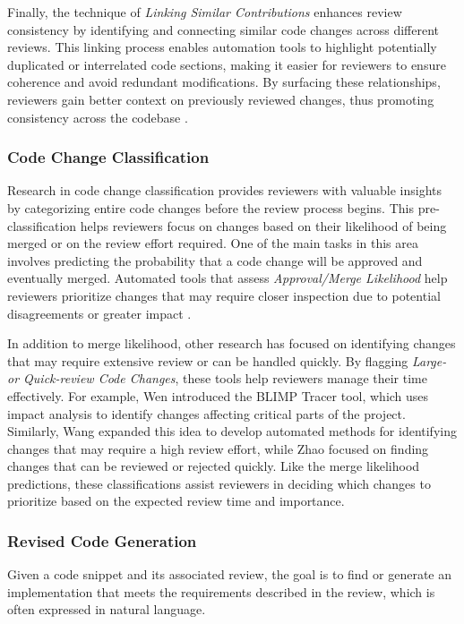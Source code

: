 Finally, the technique of \textit{Linking Similar Contributions} enhances
review consistency by identifying and connecting similar code changes across
different reviews. This linking process enables automation tools to highlight
potentially duplicated or interrelated code sections, making it easier for
reviewers to ensure coherence and avoid redundant modifications. By surfacing
these relationships, reviewers gain better context on previously reviewed
changes, thus promoting consistency across the codebase \cite{wang:ist2021a}.

\subsubsection{Code Change Classification}

Research in code change classification provides reviewers with valuable
insights by categorizing entire code changes before the review process begins.
This pre-classification helps reviewers focus on changes based on their
likelihood of being merged or on the review effort required. One of the main
tasks in this area involves predicting the probability that a code change will
be approved and eventually merged. Automated tools that assess
\textit{Approval/Merge Likelihood} help reviewers prioritize changes that may
require closer inspection due to potential disagreements or greater impact
\cite{fan:emse2018,islam:ist2022,shi:2019,wu:kbs2022,wu2022contrastive,li:fse2022}.

In addition to merge likelihood, other research has focused on identifying
changes that may require extensive review or can be handled quickly. By
flagging \textit{Large- or Quick-review Code Changes}, these tools help
reviewers manage their time effectively. For example, Wen \etal
\cite{wen:icsme2018} introduced the BLIMP Tracer tool, which uses impact
analysis to identify changes affecting critical parts of the project.
Similarly, Wang \etal \cite{wang:ist2021a} expanded this idea to develop
automated methods for identifying changes that may require a high review
effort, while Zhao \etal \cite{zhao:emse2019} focused on finding changes that
can be reviewed or rejected quickly. Like the merge likelihood predictions,
these classifications assist reviewers in deciding which changes to prioritize
based on the expected review time and importance.

\subsubsection{Revised Code Generation}
\label{sub:revised}
Given a code snippet and its associated review, the goal is to find or generate an
implementation that meets the requirements described in the review, which is
often expressed in natural language.

